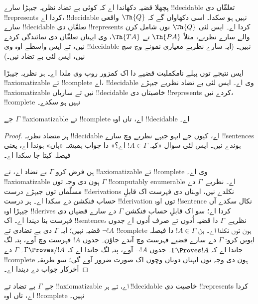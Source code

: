 \documentclass[../../../include/open-logic-section]{subfiles}
\begin{document}
\begin{explain}
پچھلا قضیہ دکھاندا اے کہ کوئی
بے تضاد نظریہ جیہڑا سارے
!!{decidable} تعلقّاں دی
!!{represents} کردا اے،
!!{decidable} نہیں ہو سکدا۔
اسی دکھاواں گے کہ
$\Th{Q}$ واقعی سارے
!!{decidable} تعلقّاں دی
!!{represents} کردا اے۔
ایس لئی $\Th{Q}$
نوں شامل کرن والے سارے
نظریے، مثلاً $\Th{PA}$
تے $\Th{TA}$، وی
ایہناں تعلقّاں دی نمائندگی
کردے نیں، تے ایس واسطے
اوہ وی !!{decidable}
نہیں۔ (ایہ سارے نظریے
معیاری نمونے وچ سچ نیں،
ایس لئی بے تضاد نیں۔)

ایس نتیجے توں پہلے
نامکملیت قضیے دا اک کمزور
روپ وی ملدا اے۔ ہر نظریہ
جیہڑا !!{axiomatizable}
تے !!{complete} اے،
!!{decidable} وی اے۔
ایس لئی بے تضاد نظریے
جیہڑے !!{axiomatizable}
نیں تے ساریاں
!!{decidable} خاصیتاں
دی !!{represents} کردے
نیں، !!{complete} نہیں
ہو سکدے۔
\end{explain}

\begin{thm}
جے $\Gamma$ !!{axiomatizable}
تے !!{complete} اے، تاں
اوہ !!{decidable} اے۔
\end{thm}

\begin{proof}
ہر متضاد نظریہ
!!{decidable} اے، کیوں جے
ایہو جیہے نظریے وچ سارے
!!{sentence}s ہوندے نیں۔
ایس لئی سوال «کیہ
$!A \in \Gamma$ اے؟»
دا جواب ہمیشہ «ہاں»
ہوندا اے، یعنی فیصلہ
کیتا جا سکدا اے۔

ہن فرض کرو $\Gamma$
بے تضاد اے، تے
!!{axiomatizable} تے
!!{complete} وی اے۔
!!{axiomatizable} ہون
دی وجہ توں $\Gamma$
!!{computably enumerable}
اے۔ نظریے~$\Gamma$ دے مسلّماں توں
جیہڑے درست !!{derivation}s نکلدے نیں،
اوہناں دی فہرست اک قابلِ حساب فنکشن
دے سکدا اے۔
ہر درست
!!{derivation} توں اوہ
!!{sentence} نکال سکدے
آں جیہڑا اوہ
!!{derive}s کردا اے؛
سو اک قابلِ حساب فنکشن
$\Gamma$ دے سارے
قضیاں دی فہرست بنا
دیندا اے۔ اک
!!{sentence}،
نظریے~$\Gamma$
دا قضیہ اُدوں تے صرف
اُدوں اے جدوں $\lnot !A$
قضیہ نہیں؛ ایہ
$\Gamma$ دی بے
تضادی تے
!!{complete} ہون
توں نکلدا اے۔
ہن $!A \in \Gamma$
دا فیصلہ ایویں کرو:
$\Gamma$ دے سارے
قضیے فہرست وچ آندے
جاؤن۔ جدوں $!A$
فہرست وچ آوے،
پتہ لگ جاندا اے
کہ $\Gamma \Proves !A$۔
جدوں $\lnot
!A$ آوے،
پتہ لگ جاندا اے
کہ $\Gamma \Proves/ !A$۔
$\Gamma$ دے
!!{complete} ہون
دی وجہ توں ایہناں
دوناں وچوں اک صورت
ضرور آوے گی؛
سو طریقہ آخرکار
جواب دے دیندا اے۔
\end{proof}

\begin{cor}
جے $\Gamma$ بے تضاد
تے !!{axiomatizable}
اے، تے ہر
!!{decidable}
خاصیت دی
!!{represents}
کردا اے، تاں
اوہ !!{complete}
نہیں۔
\end{cor}
\end{document}
